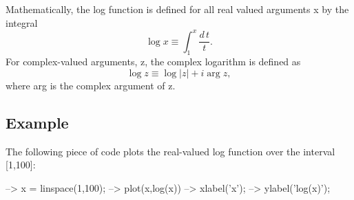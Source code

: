 Mathematically, the {\ttfamily log} function is defined for all real valued arguments {\ttfamily x} by the integral \[ \log x \equiv \int_1^{x} \frac{d\,t}{t}. \] For complex-\/valued arguments, {\ttfamily z}, the complex logarithm is defined as \[ \log z \equiv \log |z| + i \arg z, \] where {\ttfamily arg} is the complex argument of {\ttfamily z}. \hypertarget{variables_struct_Example}{}\subsection{Example}\label{variables_struct_Example}
The following piece of code plots the real-\/valued {\ttfamily log} function over the interval {\ttfamily \mbox{[}1,100\mbox{]}}\-:


\begin{DoxyVerbInclude}
--> x = linspace(1,100);
--> plot(x,log(x))
--> xlabel('x');
--> ylabel('log(x)');
\end{DoxyVerbInclude}


